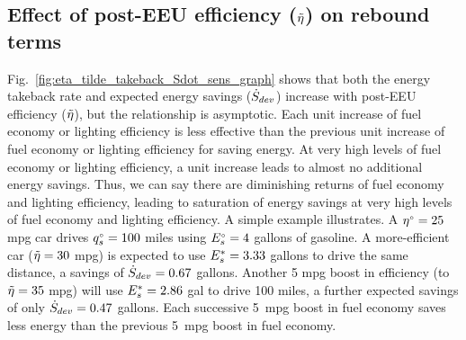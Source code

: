 \documentclass[12pt]{article}\usepackage[]{graphicx}\usepackage[]{xcolor}
\begin{document}
\subsection{Effect of post-EEU efficiency ($\tilde{\eta}$) on rebound terms} 
\label{sec:effect_of_efficiency}


  
Fig.~\ref{fig:eta_tilde_takeback_Sdot_sens_graph} shows that
both the energy takeback rate and expected energy savings ($\dot{S}_{dev}$)
increase with post-EEU efficiency ($\tilde{\eta}$), 
but the relationship is asymptotic.
Each unit increase of fuel economy or lighting efficiency is less effective than
the previous unit increase of fuel economy or lighting efficiency
for saving energy.
At very high levels of fuel economy or lighting efficiency, 
a unit increase leads to almost no additional energy savings.
Thus, we can say there are diminishing returns of fuel economy and lighting efficiency,
leading to saturation of energy savings at very high levels of fuel economy and lighting efficiency.
A simple example illustrates.
A ${}{\eta}^{\scriptscriptstyle \circ} = 25$ mpg car drives ${}{q}^{\scriptscriptstyle \circ}_s = 100$ miles 
using ${}{E}^{\scriptscriptstyle \circ}_s = 4$ gallons of gasoline.
A more-efficient car ($\tilde{\eta} = 30$ mpg) is expected to use
${E}^*_s = 3.33$ gallons to drive the same distance,
a savings of $\dot{S}_{dev} = 0.67$ gallons.
Another 5 mpg boost in efficiency (to $\tilde{\eta} = 35$ mpg)
will use ${E}^*_s = 2.86$ gal to drive 100 miles, 
a further expected savings of only $\dot{S}_{dev} = 0.47$ gallons.
Each successive 5~mpg boost in fuel economy 
saves less energy than the previous 5~mpg boost in fuel economy.
\end{document}
